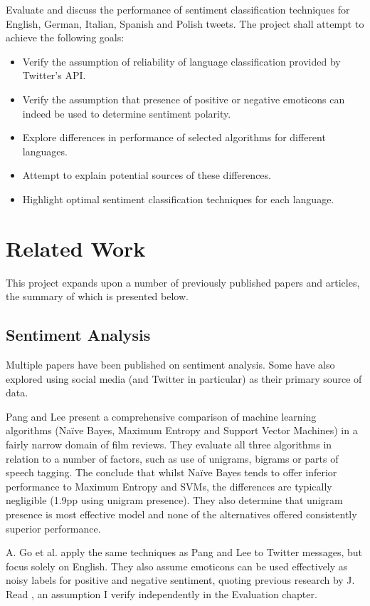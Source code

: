 Evaluate and discuss the performance of sentiment classification techniques for English, German, Italian, Spanish and Polish tweets. The project shall attempt to achieve the following goals:

\begin{itemize}
  \item Verify the assumption of reliability of language classification provided by Twitter's API.
  \item Verify the assumption that presence of positive or negative emoticons can indeed be used to determine sentiment polarity.
  \item Explore differences in performance of selected algorithms for different languages.
  \item Attempt to explain potential sources of these differences.
  \item Highlight optimal sentiment classification techniques for each language.
\end{itemize}

\section{Related Work}

This project expands upon a number of previously published papers and articles, the summary of which is presented below.

\subsection{Sentiment Analysis}

Multiple papers have been published on sentiment analysis. Some have also explored using social media (and Twitter in particular) as their primary source of data.

Pang and Lee \cite{PangAndLee} present a comprehensive comparison of machine learning algorithms (Na\"ive Bayes, Maximum Entropy and Support Vector Machines) in a fairly narrow domain of film reviews. They evaluate all three algorithms in relation to a number of factors, such as use of unigrams, bigrams or parts of speech tagging. The conclude that whilst Na\"ive Bayes tends to offer inferior performance to Maximum Entropy and SVMs, the differences are typically negligible (1.9pp using unigram presence). They also determine that unigram presence is most effective model and none of the alternatives offered consistently superior performance.

A. Go et al. \cite{TwitterDistantSupervision09} apply the same techniques as Pang and Lee to Twitter messages, but focus solely on English. They also assume emoticons can be used effectively as noisy labels for positive and negative sentiment, quoting previous research by J. Read \cite{Emoticons}, an assumption I verify independently in the Evaluation chapter.

